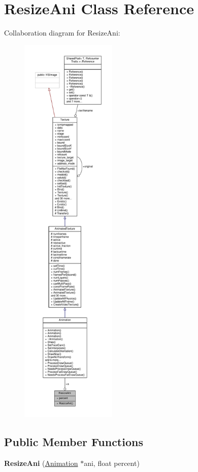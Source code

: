 \hypertarget{classResizeAni}{}\section{Resize\+Ani Class Reference}
\label{classResizeAni}


Collaboration diagram for Resize\+Ani\+:
\nopagebreak
\begin{figure}[H]
\begin{center}
\leavevmode
\includegraphics[height=550pt]{d1/d13/classResizeAni__coll__graph}
\end{center}
\end{figure}
\subsection*{Public Member Functions}
\begin{DoxyCompactItemize}
\item 
{\bfseries Resize\+Ani} (\hyperlink{classAnimation}{Animation} $\ast$ani, float percent)\hypertarget{classResizeAni_ae0eb7518fa60dff0825a8c9deb52db59}{}\label{classResizeAni_ae0eb7518fa60dff0825a8c9deb52db59}

\end{DoxyCompactItemize}
